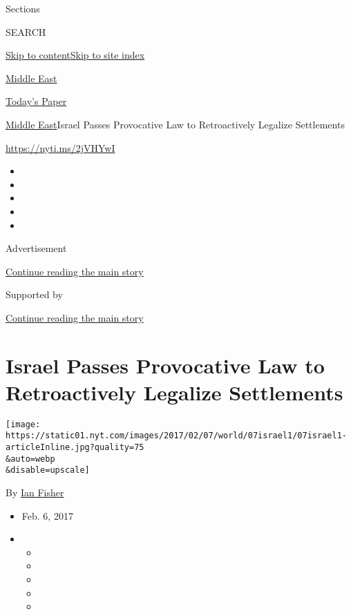 Sections

SEARCH

\protect\hyperlink{site-content}{Skip to
content}\protect\hyperlink{site-index}{Skip to site index}

\href{https://www.nytimes.com/section/world/middleeast}{Middle East}

\href{https://myaccount.nytimes.com/auth/login?response_type=cookie\&client_id=vi}{}

\href{https://www.nytimes.com/section/todayspaper}{Today's Paper}

\href{/section/world/middleeast}{Middle East}\textbar{}Israel Passes
Provocative Law to Retroactively Legalize Settlements

\url{https://nyti.ms/2jVHYwI}

\begin{itemize}
\item
\item
\item
\item
\item
\end{itemize}

Advertisement

\protect\hyperlink{after-top}{Continue reading the main story}

Supported by

\protect\hyperlink{after-sponsor}{Continue reading the main story}

\hypertarget{israel-passes-provocative-law-to-retroactively-legalize-settlements}{%
\section{Israel Passes Provocative Law to Retroactively Legalize
Settlements}\label{israel-passes-provocative-law-to-retroactively-legalize-settlements}}

\texttt{[image: https://static01.nyt.com/images/2017/02/07/world/07israel1/07israel1-articleInline.jpg?quality=75\\\&auto=webp\\\&disable=upscale]}

By \href{http://www.nytimes.com/by/ian-fisher}{Ian Fisher}

\begin{itemize}
\item
  Feb. 6, 2017
\item
  \begin{itemize}
  \item
  \item
  \item
  \item
  \item
  \end{itemize}
\end{itemize}

